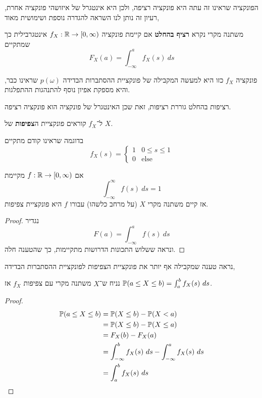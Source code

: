 הפונקציה שראינו זה עתה היא פונקציה רציפה, ולכן היא אינטגרל של איזושהי פונקציה אחרת, רעיון זה נותן לנו השראה להגדרה נוספת ושימושית מאוד,
\begin{definition}
	משתנה מקרי נקרא \textbf{רציף בהחלט} אם קיימת פונקציה $f_X : \mathbb{R} \to [0, \infty)$ אינטגרבילית כך שמתקיים
	\[
		F_X(a) = \int_{-\infty}^a f_X(s)\ ds
	\]
\end{definition}
פונקציה $f_X$ כזו היא למעשה המקבילה של פונקציית ההסתברות הבדידה $p(\omega)$ שראינו כבר, והיא מספקת אפיון נוסף להתנהגות ההתפלגות.
\begin{remark}
	רציפות בהחלט גוררת רציפות, זאת שכן האינטגרל של פונקציה הוא פונקציה רציפה.
\end{remark}
\begin{definition}
	ל־$f_X$ קוראים פונקציית ה\textbf{צפיפות} של $X$.
\end{definition}
\begin{example}
	בדוגמה שראינו קודם מתקיים
	\[
		f_X(s) = \begin{cases}
			1 & 0 \le s \le 1 \\
			0 & \text{else}
		\end{cases}
	\]
\end{example}
\begin{proposition}
	אם $f : \mathbb{R} \to [0, \infty)$ מקיימת
	\[
		\int_{-\infty}^\infty f(s)\ ds = 1
	\]
	אז קיים משתנה מקרי $X$ (על מרחב כלשהו) עבורו $f$ היא פונקציית צפיפות.
\end{proposition}
\begin{proof}
	נגדיר
	\[
		F(a) = \int_{-\infty}^a f(s)\ ds
	\]
	ונראה ששלוש התכונות הדרושות מתקיימות, כך שהטענה חלה.
\end{proof}
נראה טענה שמקבילה אף יותר את פונקציית הצפיפות לפונקציית ההסתברות הבדידה,
\begin{proposition}
	נניח ש־$X$ משתנה מקרי עם צפיפות $f_X$ אז $\PP(a \le X \le b) = \int_a^b f_X(s)\ ds$.
\end{proposition}
\begin{proof}
	\begin{align*}
		\PP(a \le X \le b)
		& = \PP(X \le b) - \PP(X < a) \\
		& = \PP(X \le b) - \PP(X \le a) \\
		& = F_X(b) - F_X(a) \\
		& = \int_{-\infty}^b f_X(s)\ ds - \int_{-\infty}^a f_X(s)\ ds \\
		& = \int_a^b f_X(s)\ ds
	\end{align*}
\end{proof}
